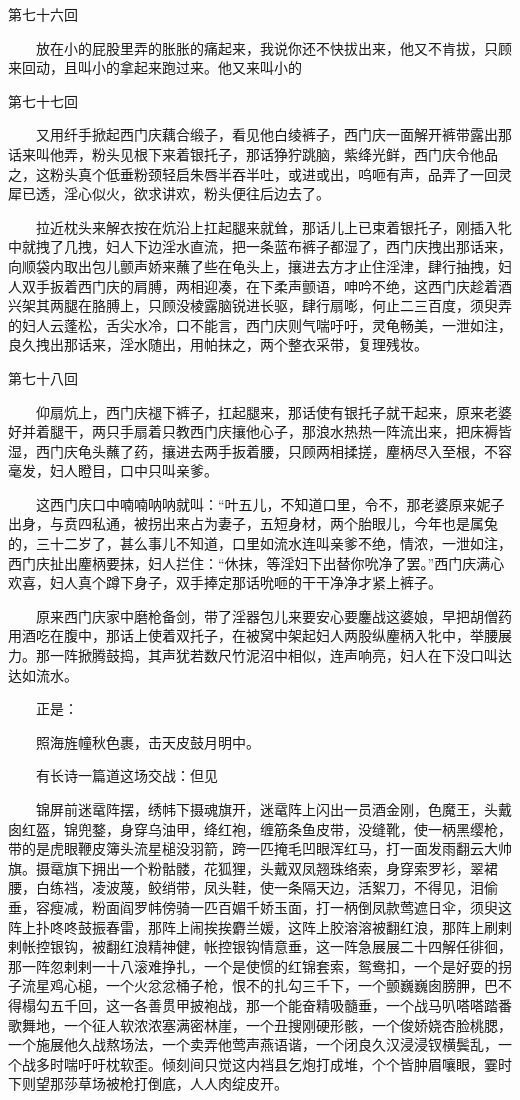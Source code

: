第七十六回

　　放在小的屁股里弄的胀胀的痛起来，我说你还不快拔出来，他又不肯拔，只顾来回动，且叫小的拿起来跑过来。他又来叫小的


第七十七回

　　又用纤手掀起西门庆藕合缎子，看见他白绫裤子，西门庆一面解开裤带露出那话来叫他弄，粉头见根下来着银托子，那话狰狞跳脑，紫绛光鲜，西门庆令他品之，这粉头真个低垂粉颈轻启朱唇半吞半吐，或进或出，呜咂有声，品弄了一回灵犀已透，淫心似火，欲求讲欢，粉头便往后边去了。


　　拉近枕头来解衣按在炕沿上扛起腿来就耸，那话儿上已束着银托子，刚插入牝中就拽了几拽，妇人下边淫水直流，把一条蓝布裤子都湿了，西门庆拽出那话来，向顺袋内取出包儿颤声娇来蘸了些在龟头上，攘进去方才止住淫津，肆行抽拽，妇人双手扳着西门庆的肩膊，两相迎凑，在下柔声颤语，呻吟不绝，这西门庆趁着酒兴架其两腿在胳膊上，只顾没棱露脑锐进长驱，肆行扇嘭，何止二三百度，须臾弄的妇人云蓬松，舌尖水冷，口不能言，西门庆则气喘吁吁，灵龟畅美，一泄如注，良久拽出那话来，淫水随出，用帕抹之，两个整衣采带，复理残妆。


第七十八回

　　仰扇炕上，西门庆褪下裤子，扛起腿来，那话使有银托子就干起来，原来老婆好并着腿干，两只手扇着只教西门庆攘他心子，那浪水热热一阵流出来，把床褥皆湿，西门庆龟头蘸了药，攘进去两手扳着腰，只顾两相揉搓，麈柄尽入至根，不容毫发，妇人瞪目，口中只叫亲爹。

　　这西门庆口中喃喃呐呐就叫：“叶五儿，不知道口里，令不，那老婆原来妮子出身，与贲四私通，被拐出来占为妻子，五短身材，两个胎眼儿，今年也是属兔的，三十二岁了，甚么事儿不知道，口里如流水连叫亲爹不绝，情浓，一泄如注，西门庆扯出麈柄要抹，妇人拦住：“休抹，等淫妇下出替你吮净了罢。”西门庆满心欢喜，妇人真个蹲下身子，双手捧定那话吮咂的干干净净才紧上裤子。


　　原来西门庆家中磨枪备剑，带了淫器包儿来要安心要鏖战这婆娘，早把胡僧药用酒吃在腹中，那话上使着双托子，在被窝中架起妇人两股纵麈柄入牝中，举腰展力。那一阵掀腾鼓捣，其声犹若数尺竹泥沼中相似，连声响亮，妇人在下没口叫达达如流水。

　　正是：

　　照海旌幢秋色裹，击天皮鼓月明中。

　　有长诗一篇道这场交战：但见

　　锦屏前迷鼋阵摆，绣帏下摄魂旗开，迷鼋阵上闪出一员酒金刚，色魔王，头戴囱红盔，锦兜鍪，身穿乌油甲，绛红袍，缠筋条鱼皮带，没缝靴，使一柄黑缨枪，带的是虎眼鞭皮簿头流星槌没羽箭，跨一匹掩毛凹眼浑红马，打一面发雨翻云大帅旗。摄鼋旗下拥出一个粉骷髅，花狐狸，头戴双凤翘珠络索，身穿索罗衫，翠裙腰，白练裆，凌波蔑，鲛绡带，凤头鞋，使一条隔天边，活絮刀，不得见，泪偷垂，容瘦减，粉面阎罗帏傍骑一匹百媚千娇玉面，打一柄倒凤款莺遮日伞，须臾这阵上扑咚咚鼓振春雷，那阵上闹挨挨麝兰媛，这阵上胶溶溶被翻红浪，那阵上刷剌剌帐控银钩，被翻红浪精神健，帐控银钩情意垂，这一阵急展展二十四解任徘徊，那一阵忽剌剌一十八滚难挣扎，一个是使惯的红锦套索，鸳鸯扣，一个是好耍的拐子流星鸡心槌，一个火忿忿桶子枪，恨不的扎勾三千下，一个颤巍巍囱膀胛，巴不得榻勾五千回，这一各善贯甲披袍战，那一个能奋精吸髓垂，一个战马叭嗒嗒踏番歌舞地，一个征人软浓浓塞满密林崖，一个丑搜刚硬形骸，一个俊娇娆杏脸桃腮，一个施展他久战熬场法，一个卖弄他莺声燕语谐，一个闭良久汉浸浸钗横鬓乱，一个战多时喘吁吁枕软歪。倾刻间只觉这内裆县乞炮打成堆，个个皆肿眉嚷眼，霎时下则望那莎草场被枪打倒底，人人肉绽皮开。

